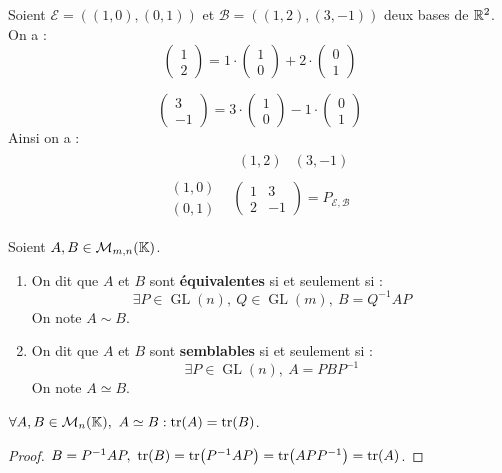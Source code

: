\begin{example}
	Soient $\mathcal{E} = ((1, 0), (0, 1))$ et $\mathcal{B} = ((1, 2), (3, -1))$ deux bases de $\mathbb{R}^2$.
	On a :
	\[
	\begin{pmatrix}
		1 \\
		2
	\end{pmatrix}
	= 
	1 \cdot
	\begin{pmatrix}
		1 \\
		0
	\end{pmatrix}
	+ 2 \cdot
	\begin{pmatrix}
		0 \\
		1
	\end{pmatrix}
	\]
	
	\[
	\begin{pmatrix}
		3 \\
		-1
	\end{pmatrix}
	=
	3 \cdot
	\begin{pmatrix}
		1 \\
		0
	\end{pmatrix}
	- 1 \cdot 
	\begin{pmatrix}
		0 \\
		1
	\end{pmatrix}
	\]
	Ainsi on a :
	\begin{align*}
		&\begin{matrix}
			(1, 2) & (3, -1)
		\end{matrix}
		\\
		\begin{matrix}
			(1, 0) \\
			(0, 1)
		\end{matrix}
		&\begin{pmatrix}
			1 & 3 \\
			2 & -1
		\end{pmatrix} = P_{\mathcal{E},\mathcal{B}}
	\end{align*}
\end{example}

\begin{definition}
    Soient $A, B \in \mathcal{M}_{m,n}(\mathbb{K})$.
    \begin{enumerate}
        \item On dit que $A$ et $B$ sont \textbf{équivalentes} si et seulement si : 
        \[ \exists P \in \operatorname{GL}(n),\ Q \in \operatorname{GL}(m),\ B = Q^{-1} A P \]
        On note $A \sim B$.
        \item On dit que $A$ et $B$ sont \textbf{semblables} si et seulement si :
        \[ \exists P \in \operatorname{GL}(n),\ A = P B P^{-1} \]
        On note $A \simeq B$.
    \end{enumerate}
\end{definition}

\begin{lemma}
	$\forall A, B \in \mathcal{M}_n(\mathbb{K}),\ A \simeq B : \tr(A) = \tr(B)$.
\end{lemma}

\begin{proof}
	$B = P^{-1} A P,\ \tr(B) = \tr(P^{-1} A P) = \tr(A P P^{-1}) = \tr(A)$.
\end{proof}